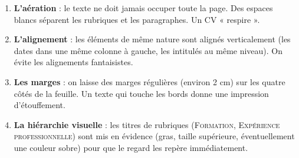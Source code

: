 \documentclass[11pt]{article}
\begin{document}
\begin{propriete}
\begin{enumerate}
\item \textbf{L'aération} : le texte ne doit jamais occuper toute la page. Des espaces blancs séparent les rubriques et les paragraphes. Un CV « respire ».
\item \textbf{L'alignement} : les éléments de même nature sont alignés verticalement (les dates dans une même colonne à gauche, les intitulés au même niveau). On évite les alignements fantaisistes.
\item \textbf{Les marges} : on laisse des marges régulières (environ 2 cm) sur les quatre côtés de la feuille. Un texte qui touche les bords donne une impression d'étouffement.
\item \textbf{La hiérarchie visuelle} : les titres de rubriques (\textsc{Formation}, \textsc{Expérience professionnelle}) sont mis en évidence (gras, taille supérieure, éventuellement une couleur sobre) pour que le regard les repère immédiatement.
\end{enumerate}
\end{propriete}
\end{document}

